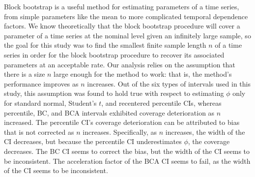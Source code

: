 \documentclass[10pt]{article}
\begin{document}
Block bootstrap is a useful method for estimating parameters of a time series,
from simple parameters like the mean to more complicated temporal dependence
factors. We know theoretically that the block bootstrap procedure will cover a 
parameter of a time series at the nominal level given an infinitely large 
sample, \citep{calhoun2018} so the goal for this study was to find the smallest 
finite sample length 
$n$ of a time series in order for the block bootstrap procedure to recover its 
associated parameters at an acceptable rate. Our analysis relies on the 
assumption that there is a size $n$ large enough for the method to work: that 
is, the method's performance improves as $n$ increases. Out of the six types of 
intervals used in this study, this assumption was found to hold true with 
respect to estimating $\phi$ only for standard normal, Student's $t$, and recentered 
percentile CIs, whereas percentile, BC, and BCA intervals exhibited coverage 
deterioration as $n$ increased. The percentile CI's coverage deterioration can 
be attributed to bias that is not corrected as $n$ increases. Specifically, as 
$n$ increases, the width of the CI decreases, but because the percentile CI 
underestimates $\phi$, the coverage decreases. The BC CI seems to correct the 
bias, but the width of the CI seems to be inconsistent. The acceleration factor 
of the BCA CI seems to fail, as the width of the CI seems to be inconsistent. 
\end{document}
